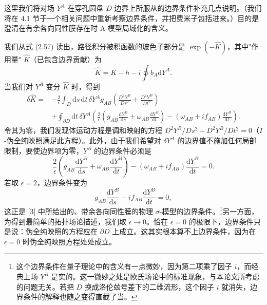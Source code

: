 \documentclass[11pt,a4paper,UTF8]{ctexart}
\theoremstyle{plain}
\theoremstyle{definition}
\begin{document}
这里我们将对场 $Y^A$ 在穿孔圆盘 $D$ 边界上所服从的边界条件补充几点说明。（我们将在 4.1 节于一个相关问题中重新考察边界条件，并把费米子包括进来。）目的是澄清在有余各向同性膜存在时 A-模型局域化的含义。

我们从式 (2.57) 读出，路径积分被积函数的玻色子部分是 $\exp(-\widehat{K})$，其中"作用量" $\widehat{K}$（已包含边界贡献）为
\begin{equation}
    \widehat{K}=K-h-i\oint b_A\mathrm{d}Y^A.
    \tag{2.61}
\end{equation}
当我们对 $Y^A$ 变分 $\widehat{K}$ 时，得到
\begin{equation}
\begin{split}
    \delta\widehat{K}={}&-\frac{2}{\epsilon}\int_D \mathrm{d}s\,\mathrm{d}t\,\delta Y^A g_{AB}\left(\frac{D^2Y^B}{Ds^2}+\frac{D^2Y^B}{Dt^2}\right)\\
    &+\oint_{\partial D}\mathrm{d}t\,\delta Y^A\left(\frac{2}{\epsilon}\left(g_{AB}\frac{\mathrm{d}Y^B}{\mathrm{d}s}+\omega_{AB}\frac{\mathrm{d}Y^B}{\mathrm{d}t}\right)-(\omega_{AB}+if_{AB})\frac{\mathrm{d}Y^B}{\mathrm{d}t}\right).
\end{split}
    \tag{2.62}
\end{equation}
令其为零，我们发现体运动方程是调和映射的方程 $D^2Y^B/Ds^2+D^2Y^B/Dt^2=0$（$I$-伪全纯映照满足此方程）。此外，由于我们希望对 $\delta Y^A$ 的边界值不施加任何局部限制，要使边界项为零，$Y^A$ 的边界条件必须是
\begin{equation}
    \frac{2}{\epsilon}\left(g_{AB}\frac{\mathrm{d}Y^B}{\mathrm{d}s}+\omega_{AB}\frac{\mathrm{d}Y^B}{\mathrm{d}t}\right)-(\omega_{AB}+if_{AB})\frac{\mathrm{d}Y^B}{\mathrm{d}t}=0.
    \tag{2.63}
\end{equation}
若取 $\epsilon=2$，边界条件变为
\begin{equation}
    g_{AB}\frac{\mathrm{d}Y^B}{\mathrm{d}s}-if_{AB}\frac{\mathrm{d}Y^B}{\mathrm{d}t}=0,
    \tag{2.64}
\end{equation}
这正是 [3] 中所给出的、带余各向同性膜的物理 $\sigma$-模型的边界条件。\footnote{这个边界条件在量子理论中的含义有一点微妙，因为第二项乘了因子 $i$，而经典上场 $Y^B$ 是实的。这一微妙之处是欧氏场论中的标准现象，与本论文所考虑的问题无关。若把 $D$ 换成洛伦兹号差下的二维流形，这个因子 $i$ 就消失，边界条件的解释也随之变得直截了当。}另一方面，为得到最简单的拓扑场论描述，我们取 $\epsilon\to0$。恰在 $\epsilon=0$ 的极限下，边界条件只是说：伪全纯映照的方程应在 $\partial D$ 上成立。这其实根本算不上边界条件，因为在 $\epsilon=0$ 时伪全纯映照方程处处成立。

\end{document}
